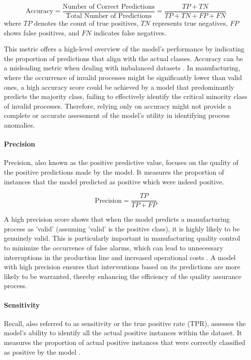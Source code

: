 \begin{equation}
  \label{eq:accuracy}
  \text{Accuracy} = \frac{\text{Number of Correct Predictions}}{\text{Total Number of Predictions}} = \frac{TP + TN}{TP + TN + FP + FN}
\end{equation}
where $TP$ denotes the count of true positives, $TN$ represents true negatives, $FP$ shows false positives, and $FN$ indicates false negatives.

This metric offers a high-level overview of the model's performance by indicating the proportion of predictions that align with the actual classes. Accuracy can be a misleading metric when dealing with imbalanced datasets \autocite{fahrmeir2016statistik}. In manufacturing, where the occurrence of invalid processes might be significantly lower than valid ones, a high accuracy score could be achieved by a model that predominantly predicts the majority class, failing to effectively identify the critical minority class of invalid processes. Therefore, relying only on accuracy might not provide a complete or accurate assessment of the model's utility in identifying process anomalies.

\paragraph{\textbf{Precision}}
Precision, also known as the positive predictive value, focuses on the quality of the positive predictions made by the model. It measures the proportion of instances that the model predicted as positive which were indeed positive.


\begin{equation}
  \label{eq:precision}
  \text{Precision} = \frac{TP}{TP + FP}
\end{equation}

A high precision score shows that when the model predicts a manufacturing process as 'valid' (assuming 'valid' is the positive class), it is highly likely to be genuinely valid. This is particularly important in manufacturing quality control to minimize the occurrence of false alarms, which can lead to unnecessary interruptions in the production line and increased operational costs \autocite{kharitonov2022comparative}. A model with high precision ensures that interventions based on its predictions are more likely to be warranted, thereby enhancing the efficiency of the quality assurance process.

\paragraph{\textbf{Sensitivity}}
Recall, also referred to as sensitivity or the true positive rate (TPR), assesses the model's ability to identify all the actual positive instances within the dataset. It measures the proportion of actual positive instances that were correctly classified as positive by the model \autocite{fahrmeir2016statistik}.

